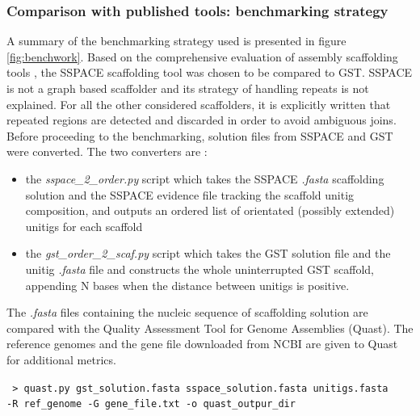 \documentclass[12pt]{article}
\begin{document}
\subsubsection{Comparison with published tools: benchmarking strategy}
A summary of the benchmarking strategy used is presented in figure \ref{fig:benchwork}. Based on the comprehensive evaluation of assembly scaffolding tools \cite{hunt_comprehensive_2014}, the SSPACE scaffolding tool was chosen to be compared to GST. SSPACE is not a graph based scaffolder and its strategy of handling repeats is not explained. For all the other considered scaffolders, it is explicitly written that repeated regions are detected and discarded in order to avoid ambiguous joins. Before proceeding to the benchmarking, solution files from SSPACE and GST were converted. The two converters are :
\begin{itemize}
\item the \textit{sspace\_2\_order.py} script which takes the SSPACE \textit{.fasta} scaffolding solution and the SSPACE evidence file tracking the scaffold unitig composition, and outputs an ordered list of orientated (possibly extended) unitigs for each scaffold
\item the \textit{gst\_order\_2\_scaf.py} script which takes the GST solution file and the unitig \textit{.fasta} file and constructs the whole uninterrupted GST scaffold, appending N bases when the distance between unitigs is positive.
\end{itemize}

The \textit{.fasta} files containing the nucleic sequence of scaffolding solution are compared with the Quality Assessment Tool for Genome Assemblies (Quast). The reference genomes and the gene file downloaded from NCBI are given to Quast for additional metrics.

\texttt{ > quast.py gst\_solution.fasta sspace\_solution.fasta unitigs.fasta \\ -R ref\_genome -G gene\_file.txt -o quast\_outpur\_dir}
\end{document}

